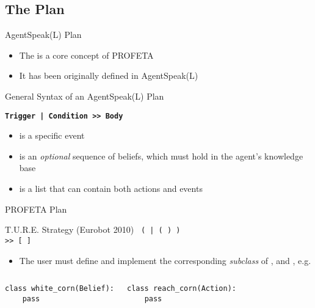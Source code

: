 \subsection{The Plan}
\begin{frame}[label=3]{AgentSpeak(L) Plan}
  \begin{itemize} 
    \item
      The  is a core concept of PROFETA
    \item
      It has been originally defined in AgentSpeak(L) %
  \end{itemize}
  \begin{exampleblock}{General Syntax of an AgentSpeak(L) Plan}
    \begin{center}
      \textbf{\texttt{Trigger | Condition >> Body}}
    \end{center}
  \end{exampleblock}
\N
  \begin{itemize}
    \item
       is a specific event
    \item 
       is an \emph{optional} sequence of beliefs, 
      which must hold in the agent's knowledge base
    \item
       is a list that can contain both actions and events
  \end{itemize}
% 
\N\N
\end{frame}


\begin{frame}[label=4, fragile]{PROFETA Plan}
  \begin{exampleblock}{T.U.R.E. Strategy (Eurobot 2010)}
    \texttt{ 
      (   | 
      (  )  ) \\
      \tab >> [ 
              ]
 }
  \end{exampleblock}
\N
  \begin{itemize} 
    \item 
      The user must define and implement the corresponding \emph{subclass} 
      of ,  and , e.g.
  \end{itemize}
  \begin{columns}
    \column{2.0in}
\begin{verbatim}
class white_corn(Belief):
    pass
\end{verbatim}
    \column{2.0in}
\begin{verbatim}
class reach_corn(Action):
    pass
\end{verbatim}
  \end{columns}
% 
\N\N\N
\end{frame}


